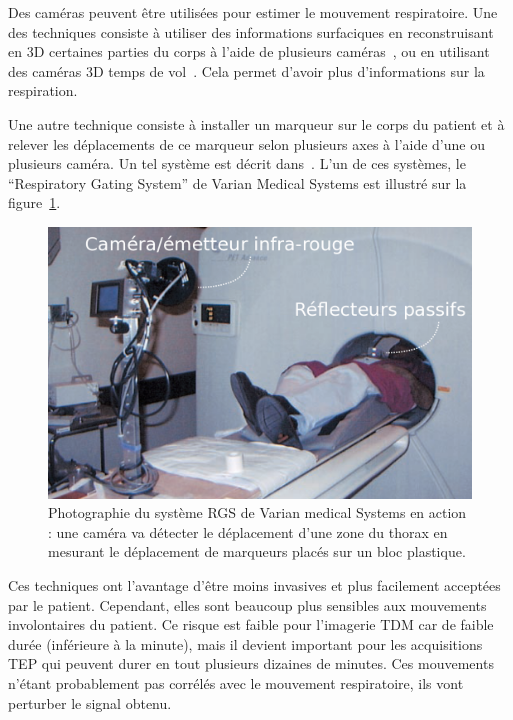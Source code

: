 Des caméras peuvent être utilisées pour estimer le mouvement respiratoire. Une des techniques consiste à utiliser des informations surfaciques en reconstruisant en 3D certaines parties du corps à l'aide de plusieurs caméras~\cite{beach2004feasibility}, ou en utilisant des caméras 3D temps de vol~\cite{fayad2009patient}. Cela permet d'avoir plus d'informations sur la respiration.

Une autre technique consiste à installer un marqueur sur le corps du patient et à relever les déplacements de ce marqueur selon plusieurs axes à l'aide d'une ou plusieurs caméra. Un tel système est décrit dans~\cite{nehmeh2002effect}. L'un de ces systèmes, le ``Respiratory Gating System'' de Varian Medical Systems est illustré sur  la figure~\ref{fig:RGSdeVarian}.

\begin{figure}[h!]
	\begin{center}
		\includegraphics[width=12cm]{images/varian}
	\end{center}
	\caption[Photographie du système RGS de Varian medical Systems en action]{Photographie du système RGS de Varian medical Systems en action : une caméra va détecter le déplacement d'une zone du thorax en mesurant le déplacement de marqueurs placés sur un bloc plastique.} 
	\label{fig:RGSdeVarian}
\end{figure}

Ces techniques ont l'avantage d'être moins invasives et plus facilement acceptées par le patient. Cependant, elles sont beaucoup plus sensibles aux mouvements involontaires du patient. Ce risque est faible pour l'imagerie TDM car de faible durée (inférieure à la minute), mais il devient important pour les acquisitions TEP qui peuvent durer en tout plusieurs dizaines de minutes. Ces mouvements n'étant probablement pas corrélés avec le mouvement respiratoire, ils vont perturber le signal obtenu. 

